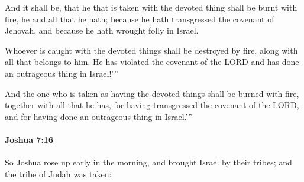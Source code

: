 			\begin{versebox}
					\item[BHS] 
					\item[ASV] And it shall be, that he that is taken with the devoted thing shall be burnt with fire, he and all that he hath; because he hath transgressed the covenant of Jehovah, and because he hath wrought folly in Israel.
					\item[NIV] Whoever is caught with the devoted things shall be destroyed by fire, along with all that belongs to him. He has violated the covenant of the LORD and has done an outrageous thing in Israel!’”
					\item[NRSV] And the one who is taken as having the devoted things shall be burned with fire, together with all that he has, for having transgressed the covenant of the LORD, and for having done an outrageous thing in Israel.’”
			\end{versebox}

		\paragraph{Joshua 7:16} %
			\label{JOSHUA-7-16}

			So Joshua rose up early in the morning, and brought Israel by their tribes; and the tribe of Judah was taken:

